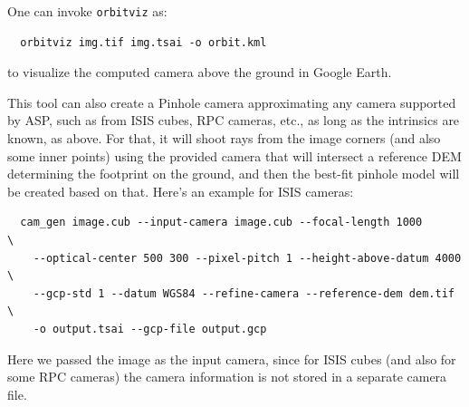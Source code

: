 One can invoke \texttt{orbitviz} as:
\begin{verbatim}
  orbitviz img.tif img.tsai -o orbit.kml
\end{verbatim}

to visualize the computed camera above the ground in Google Earth. 

This tool can also create a Pinhole camera approximating any camera
supported by ASP, such as from ISIS cubes, RPC cameras, etc., as long as
the intrinsics are known, as above. For that, it will shoot rays from
the image corners (and also some inner points) using the provided camera
that will intersect a reference DEM determining the footprint on the
ground, and then the best-fit pinhole model will be created based on that.
Here's an example for ISIS cameras:

\begin{verbatim}
  cam_gen image.cub --input-camera image.cub --focal-length 1000       \
    --optical-center 500 300 --pixel-pitch 1 --height-above-datum 4000 \
    --gcp-std 1 --datum WGS84 --refine-camera --reference-dem dem.tif  \
    -o output.tsai --gcp-file output.gcp 
\end{verbatim}

Here we passed the image as the input camera, since for ISIS cubes
(and also for some RPC cameras) the camera information is not stored
in a separate camera file.


